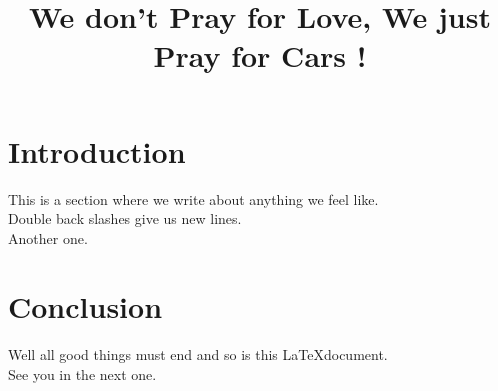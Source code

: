 \documentclass[12pts]{article}
\begin{document}
\title{We don't Pray for Love, We just  Pray for Cars !}
\maketitle

\section{Introduction}
This is a section where we write about anything we feel like.\\
Double back slashes give us new lines.\\
Another one.

\section{Conclusion}
Well all good things must end and so is this \LaTeX document.\\See you in the next one.
\end{document}
